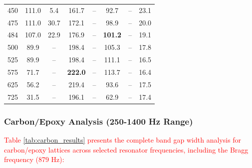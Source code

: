 \documentclass[review,numbers,sort&compress]{elsarticle}
\begin{document}
{\begin{table}[!htb]
\begin{tabular}{cccccccc}
450 & 111.0 & 5.4 & 161.7 & -- & 92.7 & -- & 23.1 \\
475 & 111.0 & 30.7 & 172.1 & -- & 98.9 & -- & 20.0 \\
484\protect\footnotemark[2] & 107.0 & 22.9 & 176.9 & -- & \textbf{101.2} & -- & 19.1 \\
500 & 89.9 & -- & 198.4 & -- & 105.3 & -- & 17.8 \\
525 & 89.9 & -- & 198.4 & -- & 111.1 & -- & 16.5 \\
575 & 71.7 & -- & \textbf{222.0} & -- & 113.7 & -- & 16.4 \\
625 & 56.2 & -- & 219.4 & -- & 93.6 & -- & 17.5 \\
725 & 31.5 & -- & 196.1 & -- & 62.9 & -- & 17.4 \\
\hline
\end{tabular}
\end{table}}

\subsubsection{Carbon/Epoxy Analysis (250-1400 Hz Range)}

\textcolor{red}{Table \ref{tab:carbon_results} presents the complete band gap width analysis for carbon/epoxy lattices across selected resonator frequencies, including the Bragg frequency (879 Hz):}
\end{document}

